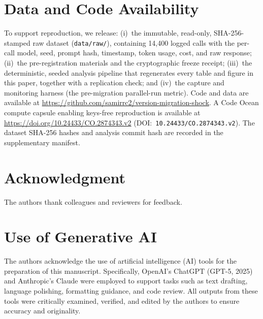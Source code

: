 \documentclass{ieeeaccess}
\begin{document}
\section*{Data and Code Availability}
To support reproduction, we release: (i)~the immutable, read-only,
SHA-256-stamped raw dataset (\texttt{data/raw/}), containing 14{,}400 logged
calls with the per-call model, seed, prompt hash, timestamp, token usage, cost,
and raw response; (ii)~the pre-registration materials and the cryptographic
freeze receipt; (iii)~the deterministic, seeded analysis pipeline that
regenerates every table and figure in this paper, together with a replication
check; and (iv)~the capture and monitoring harness (the pre-migration
parallel-run metric). Code and data are available at
\url{https://github.com/samirrc2/version-migration-shock}.
A Code Ocean compute capsule enabling keys-free reproduction is available at
\url{https://doi.org/10.24433/CO.2874343.v2}
(DOI:~\texttt{10.24433/CO.2874343.v2}).
The dataset SHA-256 hashes and analysis commit hash are recorded in the
supplementary manifest.

\section*{Acknowledgment}
The authors thank colleagues and reviewers for feedback.

\section*{Use of Generative AI}
The authors acknowledge the use of artificial intelligence (AI) tools for the
preparation of this manuscript. Specifically, OpenAI's ChatGPT (GPT-5, 2025)
and Anthropic's Claude were employed to support tasks such as text drafting,
language polishing, formatting guidance, and code review. All outputs from
these tools were critically examined, verified, and edited by the authors to
ensure accuracy and originality.
\end{document}
